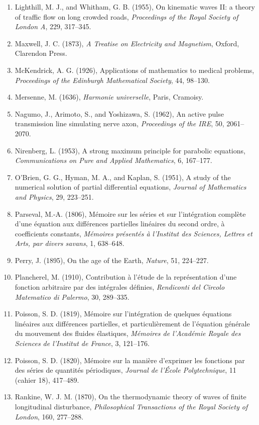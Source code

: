 \documentclass[11pt,a4paper]{article}
\numberwithin{equation}{section}
\theoremstyle{definition}
\begin{document}
\begin{enumerate}
\item Lighthill, M. J., and Whitham, G. B. (1955), On kinematic waves II: a theory of traffic flow on long crowded roads, \emph{Proceedings of the Royal Society of London A}, 229, 317--345.
\item Maxwell, J. C. (1873), \emph{A Treatise on Electricity and Magnetism}, Oxford, Clarendon Press.
\item McKendrick, A. G. (1926), Applications of mathematics to medical problems, \emph{Proceedings of the Edinburgh Mathematical Society}, 44, 98--130.
\item Mersenne, M. (1636), \emph{Harmonie universelle}, Paris, Cramoisy.
\item Nagumo, J., Arimoto, S., and Yoshizawa, S. (1962), An active pulse transmission line simulating nerve axon, \emph{Proceedings of the IRE}, 50, 2061--2070.
\item Nirenberg, L. (1953), A strong maximum principle for parabolic equations, \emph{Communications on Pure and Applied Mathematics}, 6, 167--177.
\item O'Brien, G. G., Hyman, M. A., and Kaplan, S. (1951), A study of the numerical solution of partial differential equations, \emph{Journal of Mathematics and Physics}, 29, 223--251.
\item Parseval, M.-A. (1806), M\'emoire sur les s\'eries et sur l'int\'egration compl\`ete d'une \'equation aux diff\'erences partielles lin\'eaires du second ordre, \`a coefficients constants, \emph{M\'emoires pr\'esent\'es \`a l'Institut des Sciences, Lettres et Arts, par divers savans}, 1, 638--648.
\item Perry, J. (1895), On the age of the Earth, \emph{Nature}, 51, 224--227.
\item Plancherel, M. (1910), Contribution \`a l'\'etude de la repr\'esentation d'une fonction arbitraire par des int\'egrales d\'efinies, \emph{Rendiconti del Circolo Matematico di Palermo}, 30, 289--335.
\item Poisson, S. D. (1819), M\'emoire sur l'int\'egration de quelques \'equations lin\'eaires aux diff\'erences partielles, et particuli\`erement de l'\'equation g\'en\'erale du mouvement des fluides \'elastiques, \emph{M\'emoires de l'Acad\'emie Royale des Sciences de l'Institut de France}, 3, 121--176.
\item Poisson, S. D. (1820), M\'emoire sur la mani\`ere d'exprimer les fonctions par des s\'eries de quantit\'es p\'eriodiques, \emph{Journal de l'\'Ecole Polytechnique}, 11 (cahier 18), 417--489.
\item Rankine, W. J. M. (1870), On the thermodynamic theory of waves of finite longitudinal disturbance, \emph{Philosophical Transactions of the Royal Society of London}, 160, 277--288.

\end{enumerate}
\end{document}
